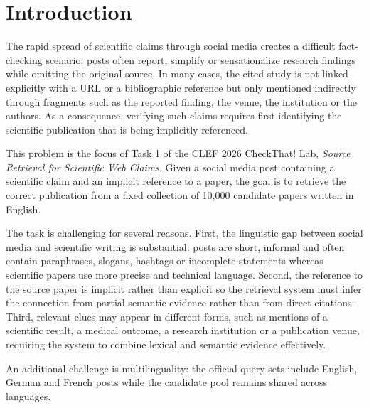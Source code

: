 \section{Introduction}
\label{sec:introduction}

The rapid spread of scientific claims through social media creates a difficult fact-checking scenario: posts often report, simplify or sensationalize research findings while omitting the original source. In many cases, the cited study is not linked explicitly with a URL or a bibliographic reference but only mentioned indirectly through fragments such as the reported finding, the venue, the institution or the authors. As a consequence, verifying such claims requires first identifying the scientific publication that is being implicitly referenced.

This problem is the focus of Task 1 of the CLEF 2026 CheckThat! Lab, \emph{Source Retrieval for Scientific Web Claims}. Given a social media post containing a scientific claim and an implicit reference to a paper, the goal is to retrieve the correct publication from a fixed collection of 10,000 candidate papers written in English.

The task is challenging for several reasons. First, the linguistic gap between social media and scientific writing is substantial: posts are short, informal and often contain paraphrases, slogans, hashtags or incomplete statements whereas scientific papers use more precise and technical language. Second, the reference to the source paper is implicit rather than explicit so the retrieval system must infer the connection from partial semantic evidence rather than from direct citations. Third, relevant clues may appear in different forms, such as mentions of a scientific result, a medical outcome, a research institution or a publication venue, requiring the system to combine lexical and semantic evidence effectively.

An additional challenge is multilinguality: the official query sets include English, German and French posts while the candidate pool remains shared across languages.

